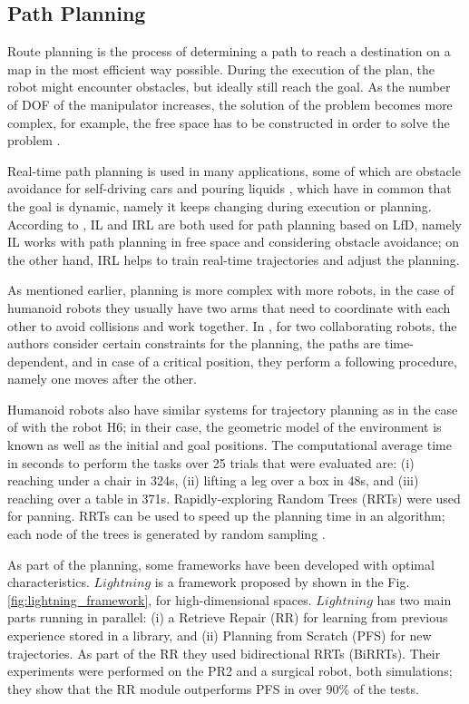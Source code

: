 \documentclass[thesis]{mas_proposal}
\begin{document}
    \subsection{Path Planning}
    
    Route planning is the process of determining a path to reach a destination on a map in the most efficient way possible. During the execution of the plan, the robot might encounter obstacles, but ideally still reach the goal. As the number of DOF of the manipulator increases, the solution of the problem becomes more complex, for example, the free space has to be constructed in order to solve the problem \cite{Siegwart2011}. 
    
    Real-time path planning is used in many applications, some of which are obstacle avoidance for self-driving cars \cite{Chaocheng2015} and pouring liquids \cite{Yamaguchi2015}, which have in common that the goal is dynamic, namely it keeps changing during execution or planning. According to \cite{Xie2020}, IL and IRL are both used for path planning based on LfD, namely IL works with path planning in free space and considering obstacle avoidance; on the other hand, IRL helps to train real-time trajectories and adjust the planning. 
    
    As mentioned earlier, planning is more complex with more robots, in the case of humanoid robots they usually have two arms that need to coordinate with each other to avoid collisions and work together. In \cite{Pecora2018}, for two collaborating robots, the authors consider certain constraints for the planning, the paths are time-dependent, and in case of a critical position, they perform a following procedure, namely one moves after the other.
    
    Humanoid robots also have similar systems for trajectory planning as in the case of \cite{Kuffner2001} with the robot H6; in their case, the geometric model of the environment is known as well as the initial and goal positions. The computational average time in seconds to perform the tasks over 25 trials that were evaluated are: (i) reaching under a chair in 324s, (ii) lifting a leg over a box in 48s, and (iii) reaching over a table in 371s. Rapidly-exploring Random Trees (RRTs) were used for panning. RRTs can be used to speed up the planning time in an algorithm; each node of the trees is generated by random sampling \cite{Veras2019}.
    
    As part of the planning, some frameworks have been developed with optimal characteristics. $Lightning$ is a framework proposed by \cite{Berenson2012} shown in the Fig. \ref{fig:lightning_framework}, for high-dimensional spaces. $Lightning$ has two main parts running in parallel: (i) a Retrieve Repair (RR) for learning from previous experience stored in a library, and (ii) Planning from Scratch (PFS) for new trajectories. As part of the RR they used bidirectional RRTs (BiRRTs). Their experiments were performed on the PR2 and a surgical robot, both simulations; they show that the RR module outperforms PFS in over 90\% of the tests.
    
\end{document}
